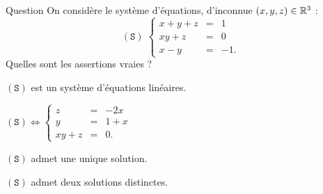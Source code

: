 \begin{multi}[multiple,feedback=
{\((\mathtt{S})\) n'est pas un système d'équations linéaires.
\[(\mathtt{S}) \Leftrightarrow  \left\{\begin{array}{rcc}
z&=&1-x-y\\
y&=&1+x\\ 
xy+z&=&0\\ 
\end{array}\right. \Leftrightarrow  \left\{\begin{array}{rcc}
z&=&-2x\\
y&=&1+x\\ 
x(x-1)&=&0.\\ 
\end{array}\right. \]
Donc \((\mathtt{S})\) admet deux solutions : \((0,1,0)\) et \((1,2,-2)\).
}]{Question}
On considère le système d'équations, d'inconnue \((x,y,z)\in \mathbb{R}^3\) :  
\[(\mathtt{S}) \; \left\{\begin{array}{rcc}
x+y+z&=&1\\
xy+z&=&0\\
x-y&=&-1.\end{array}\right.\]
Quelles sont les assertions vraies ?

    \item \((\mathtt{S})\) est un système d'équations linéaires.
    \item* \((\mathtt{S}) \Leftrightarrow  \left\{\begin{array}{rcc}
z&=&-2x\\
y&=&1+x\\
xy+z&=&0.\end{array}\right.\)
    \item \((\mathtt{S})\) admet une unique solution.
    \item* \((\mathtt{S})\) admet deux solutions distinctes.
\end{multi}


